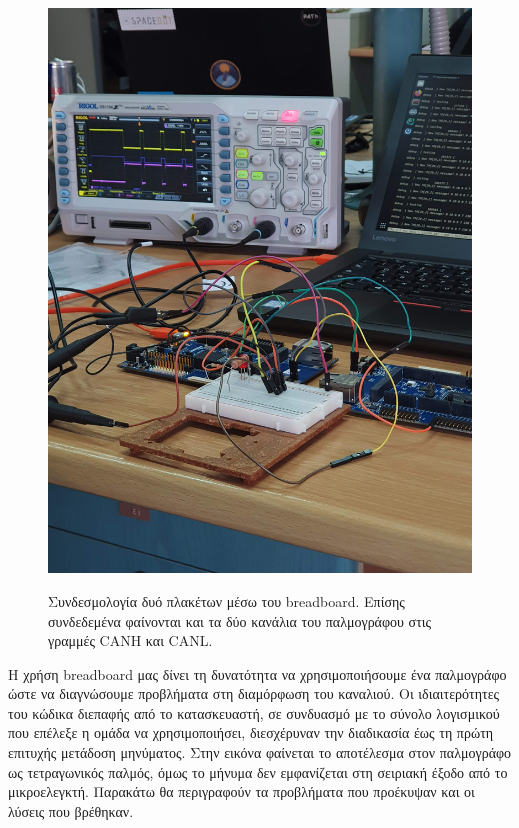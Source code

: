 \documentclass[a4paper,nobib,justified]{tufte-book}
\begin{document}
\begin{figure}[ht]
	\centering
	\includegraphics[angle=270,origin=c]{media/images/lab-wiring-scope.jpg}
	\label{fig:lab-wiring-scope}
	\caption[Συνδεσμολογία δυό πλακέτων μέσω του breadboard]{Συνδεσμολογία δυό πλακέτων μέσω του breadboard. Επίσης συνδεδεμένα φαίνονται και τα δύο κανάλια του παλμογράφου στις γραμμές CANH και CANL.}
\end{figure}

Η χρήση breadboard μας δίνει τη δυνατότητα να χρησιμοποιήσουμε ένα παλμογράφο ώστε να διαγνώσουμε προβλήματα στη διαμόρφωση του καναλιού. Οι ιδιαιτερότητες του κώδικα διεπαφής από το κατασκευαστή, σε συνδυασμό με το σύνολο λογισμικού που επέλεξε η ομάδα να χρησιμοποιήσει, διεσχέρυναν την διαδικασία έως τη πρώτη επιτυχής μετάδοση μηνύματος. Στην εικόνα φαίνεται το αποτέλεσμα στον παλμογράφο ως τετραγωνικός παλμός, όμως το μήνυμα δεν εμφανίζεται στη σειριακή έξοδο από το μικροελεγκτή. Παρακάτω θα περιγραφούν τα προβλήματα που προέκυψαν και οι λύσεις που βρέθηκαν.
\end{document}
